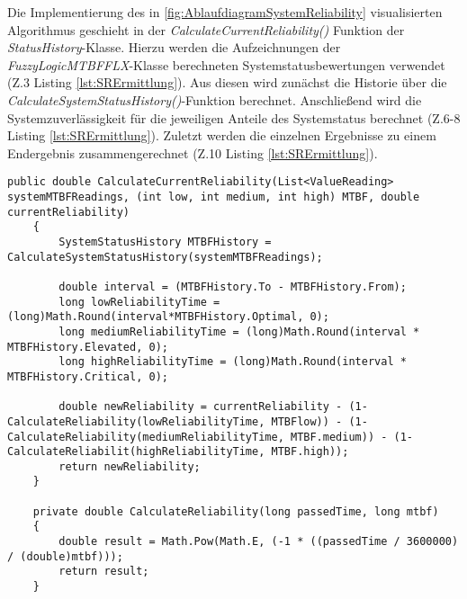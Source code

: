 Die Implementierung des in \ref{fig:AblaufdiagramSystemReliability} visualisierten Algorithmus geschieht in der \textit{CalculateCurrentReliability()} Funktion der \textit{StatusHistory}-Klasse. Hierzu werden die Aufzeichnungen der \textit{FuzzyLogicMTBFFLX}-Klasse berechneten Systemstatusbewertungen verwendet (Z.3 Listing \ref{lst:SRErmittlung}). Aus diesen wird zunächst die Historie über die \textit{CalculateSystemStatusHistory()}-Funktion berechnet. Anschließend wird die Systemzuverlässigkeit für die jeweiligen Anteile des Systemstatus berechnet (Z.6-8 Listing \ref{lst:SRErmittlung}). Zuletzt werden die einzelnen Ergebnisse zu einem Endergebnis zusammengerechnet (Z.10 Listing \ref{lst:SRErmittlung}).
\begin{lstlisting}[caption={Implementierung der Systemzuverlässigkeits Ermittlung}, label={lst:SRErmittlung}]
    public double CalculateCurrentReliability(List<ValueReading> systemMTBFReadings, (int low, int medium, int high) MTBF, double currentReliability)
    {
        SystemStatusHistory MTBFHistory = CalculateSystemStatusHistory(systemMTBFReadings);

        double interval = (MTBFHistory.To - MTBFHistory.From);
        long lowReliabilityTime = (long)Math.Round(interval*MTBFHistory.Optimal, 0);
        long mediumReliabilityTime = (long)Math.Round(interval * MTBFHistory.Elevated, 0);
        long highReliabilityTime = (long)Math.Round(interval * MTBFHistory.Critical, 0);

        double newReliability = currentReliability - (1-CalculateReliability(lowReliabilityTime, MTBFlow)) - (1-CalculateReliability(mediumReliabilityTime, MTBF.medium)) - (1-CalculateReliabilit(highReliabilityTime, MTBF.high)); 
        return newReliability;
    }
       
    private double CalculateReliability(long passedTime, long mtbf)
    {
        double result = Math.Pow(Math.E, (-1 * ((passedTime / 3600000) / (double)mtbf)));
        return result;
    }\end{lstlisting}



